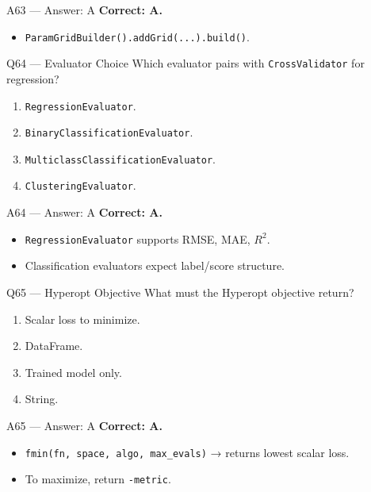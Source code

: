 \documentclass[aspectratio=169,10pt]{beamer}
\begin{document}
	\begin{frame}{A63 — Answer: A}
		\textbf{Correct: A.}
		\begin{itemize}
			\item \texttt{ParamGridBuilder().addGrid(...).build()}.
		\end{itemize}
	\end{frame}
	
	\begin{frame}{Q64 — Evaluator Choice}
		Which evaluator pairs with \texttt{CrossValidator} for regression?
		\begin{enumerate}[label=\Alph*.]
			\item \texttt{RegressionEvaluator}.
			\item \texttt{BinaryClassificationEvaluator}.
			\item \texttt{MulticlassClassificationEvaluator}.
			\item \texttt{ClusteringEvaluator}.
		\end{enumerate}
	\end{frame}
	
	\begin{frame}{A64 — Answer: A}
		\textbf{Correct: A.}
		\begin{itemize}
			\item \texttt{RegressionEvaluator} supports RMSE, MAE, $R^2$.
			\item Classification evaluators expect label/score structure.
		\end{itemize}
	\end{frame}
	
	\begin{frame}{Q65 — Hyperopt Objective}
		What must the Hyperopt objective return?
		\begin{enumerate}[label=\Alph*.]
			\item Scalar loss to minimize.
			\item DataFrame.
			\item Trained model only.
			\item String.
		\end{enumerate}
	\end{frame}
	
	\begin{frame}{A65 — Answer: A}
		\textbf{Correct: A.}
		\begin{itemize}
			\item \texttt{fmin(fn, space, algo, max\_evals)} → returns lowest scalar loss.
			\item To maximize, return \texttt{-metric}.
		\end{itemize}
	\end{frame}
	
\end{document}
